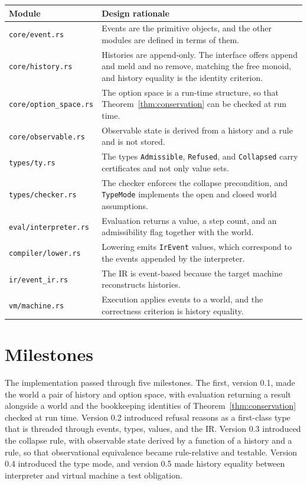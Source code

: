 \documentclass[12pt,oneside,openany]{book}
\theoremstyle{spherepop}
\theoremstyle{remarkstyle}
\begin{document}
\medskip
\begin{center}
\begin{tabular}{lp{}}
\toprule
Module & Design rationale \\
\midrule
\texttt{core/event.rs} & Events are the primitive objects, and the other modules are defined in terms of them. \\[4pt]
\texttt{core/history.rs} & Histories are append-only. The interface offers append and meld and no remove, matching the free monoid, and history equality is the identity criterion. \\[4pt]
\texttt{core/option\_space.rs} & The option space is a run-time structure, so that Theorem~\ref{thm:conservation} can be checked at run time. \\[4pt]
\texttt{core/observable.rs} & Observable state is derived from a history and a rule and is not stored. \\[4pt]
\texttt{types/ty.rs} & The types \texttt{Admissible}, \texttt{Refused}, and \texttt{Collapsed} carry certificates and not only value sets. \\[4pt]
\texttt{types/checker.rs} & The checker enforces the collapse precondition, and \texttt{TypeMode} implements the open and closed world assumptions. \\[4pt]
\texttt{eval/interpreter.rs} & Evaluation returns a value, a step count, and an admissibility flag together with the world. \\[4pt]
\texttt{compiler/lower.rs} & Lowering emits \texttt{IrEvent} values, which correspond to the events appended by the interpreter. \\[4pt]
\texttt{ir/event\_ir.rs} & The IR is event-based because the target machine reconstructs histories. \\[4pt]
\texttt{vm/machine.rs} & Execution applies events to a world, and the correctness criterion is history equality. \\
\bottomrule
\end{tabular}
\end{center}

\section{Milestones}

The implementation passed through five milestones. The first, version 0.1, made the world a pair of history and option space, with evaluation returning a result alongside a world and the bookkeeping identities of Theorem~\ref{thm:conservation} checked at run time. Version 0.2 introduced refusal reasons as a first-class type that is threaded through events, types, values, and the IR. Version 0.3 introduced the collapse rule, with observable state derived by a function of a history and a rule, so that observational equivalence became rule-relative and testable. Version 0.4 introduced the type mode, and version 0.5 made history equality between interpreter and virtual machine a test obligation.
\end{document}
